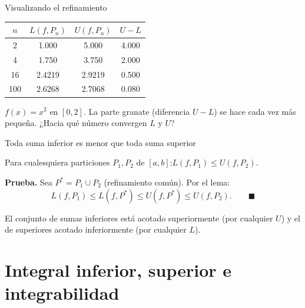 \documentclass[10pt,aspectratio=169]{beamer}
\begin{document}
\begin{frame}{Visualizando el refinamiento}
  \vspace{2mm}
  \begin{tabular}{c|ccc}
    $n$ & $L(f,P_n)$ & $U(f,P_n)$ & $U-L$\\ \hline
    2 & 1.000 & 5.000 & 4.000\\
    4 & 1.750 & 3.750 & 2.000\\
    16 & 2.4219 & 2.9219 & 0.500\\
    100 & 2.6268 & 2.7068 & 0.080
  \end{tabular}
  \quad
  \begin{minipage}{6cm}
    \small $f(x)=x^2$ en $[0,2]$. La parte granate (diferencia $U-L$) se hace cada vez más pequeña.
    ¿Hacia qué número convergen $L$ y $U$?
  \end{minipage}
\end{frame}

\begin{frame}{Toda suma inferior es menor que toda suma superior}
  \begin{teorema}
    Para cualesquiera particiones $P_1,P_2$ de $[a,b]$:\qquad $L(f,P_1)\le U(f,P_2)$.
  \end{teorema}
  \textbf{Prueba.} Sea $P^*=P_1\cup P_2$ (refinamiento común). Por el lema:
  \[ L(f,P_1)\le L(f,P^*)\le U(f,P^*)\le U(f,P_2).\qquad\blacksquare \]
  \begin{center}
  \end{center}
  El conjunto de sumas inferiores está acotado superiormente (por cualquier $U$) y el de superiores
  acotado inferiormente (por cualquier $L$).
\end{frame}

\section{Integral inferior, superior e integrabilidad}
\end{document}
